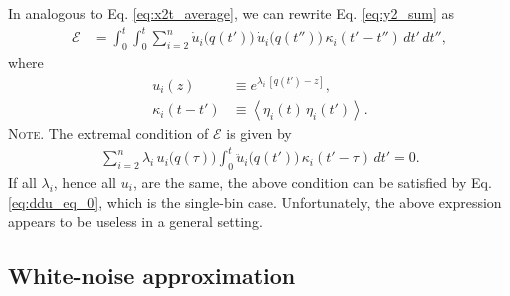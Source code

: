 \documentclass[reprint]{revtex4-1}
\newcommand{\note}[1]{{\color{DarkGreen}\footnotesize \textsc{Note.} #1}}
\begin{document}
In analogous to Eq. \eqref{eq:x2t_average},
we can rewrite Eq. \eqref{eq:y2_sum} as
%
\begin{align}
  \mathcal E
  &=
  \int_0^t \int_0^t
  \sum_{i = 2}^n
  \dot u_i\bigl( q(t') \bigr) \,
  \dot u_i\bigl( q(t'') \bigr) \,
  \kappa_i(t' - t'') \, dt' \, dt'',
  \label{eq:error_mbin}
\end{align}
%
where
\begin{align*}
  u_i(z)
  &\equiv
  e^{\lambda_i \, [q(t') - z]},
  \\
  \kappa_i(t - t')
  &\equiv
  \left\langle
    \eta_i(t) \, \eta_i(t')
  \right\rangle.
\end{align*}
%
\note{The extremal condition of $\mathcal E$ is given by
%
\begin{align}
\sum_{i=2}^n
\lambda_i \, u_i\bigl( q(\tau) \bigr)
\int_0^t
\ddot u_i\bigl( q(t') \bigr) \, \kappa_i(t' - \tau) \, dt' = 0.
\label{eq:optimal_mbin}
\end{align}
%
If all $\lambda_i$, hence all $u_i$, are the same,
the above condition can be satisfied
by Eq. \eqref{eq:ddu_eq_0},
which is the single-bin case.
%
Unfortunately, the above expression
appears to be useless in a general setting.
}



\subsection{White-noise approximation}
\end{document}
